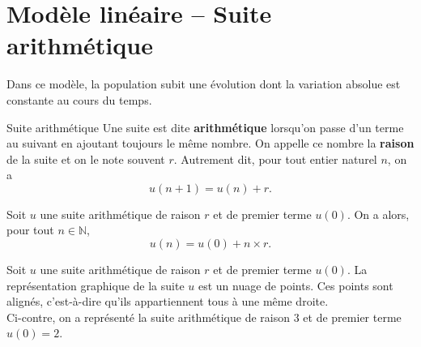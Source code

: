 \documentclass[11pt]{article}
\begin{document}
\section{Modèle linéaire -- Suite arithmétique}

Dans ce modèle, la population subit une évolution dont la variation absolue est
constante au cours du temps.

\begin{defi}{Suite arithmétique}
  Une suite est dite \textbf{arithmétique} lorsqu'on passe d'un terme au suivant
  en ajoutant toujours le même nombre. On appelle ce nombre la
  \textbf{raison} de la suite et on le note souvent $r$. Autrement dit, pour
  tout entier naturel $n$, on a
  \[
    u(n+1) = u(n) + r.
  \]
\end{defi}

\begin{prop}
  Soit $u$ une suite arithmétique de raison $r$ et de premier terme $u(0)$. On a
  alors, pour tout $n\in\mathbb{N}$,
  \[
    u(n) = u(0) + n\times r.
  \]
\end{prop}

\begin{prop}
\begin{minipage}{.5\textwidth}
  Soit $u$ une suite arithmétique de raison $r$ et de premier terme $u(0)$. La
  représentation graphique de la suite $u$ est un nuage de points. Ces points
  sont alignés, c'est-à-dire qu'ils appartiennent tous à une même droite.\\[2mm]

  Ci-contre, on a représenté la suite arithmétique de raison $3$ et de premier
  terme $u(0)=2$.
\end{minipage}
\begin{minipage}{.5\textwidth}
\begin{center}
\end{center}
\end{minipage}
\end{prop}
\end{document}
